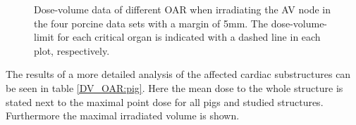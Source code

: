 \documentclass[type=dr, dr=rernat, accentcolor=tud7b,colorbacktitle, bigchapter, openright, twoside, 12pt ]{tudthesis}
\begin{document}
\begin{figure}[H]
{ }
\caption{Dose-volume data of different OAR when irradiating the AV node in the four porcine data sets with a margin of 5mm. 
The dose-volume-limit for each critical organ is indicated with a dashed line in each plot, respectively.}
\label{static_dosevolume_oar_pig}
\end{figure}

\newpage

The results of a more detailed analysis of the affected cardiac substructures can be seen in table \ref{DV_OAR:pig}. Here the mean dose to the 
whole structure is stated next to the maximal point dose for all pigs and studied structures. Furthermore the maximal irradiated volume 
is shown. 
\end{document}
